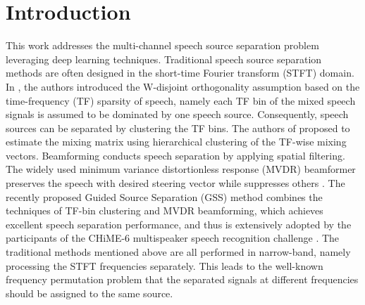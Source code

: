 \documentclass{article}
\begin{document}
\section{Introduction}
\label{sec:intro}
This work addresses the multi-channel speech source separation problem leveraging deep learning techniques. 
Traditional speech source separation methods are often designed in the short-time Fourier transform (STFT) domain.
In \cite{yilmaz_blind_2004}, the authors introduced the W-disjoint orthogonality assumption based on the time-frequency (TF) sparsity of speech, namely each TF bin of the mixed speech signals is assumed to be dominated by one speech source. Consequently, speech sources can be separated by clustering the TF bins. 
The authors of \cite{winter_map-based_2006} proposed to estimate the mixing matrix using hierarchical clustering of the TF-wise mixing vectors.
Beamforming conducts speech separation by applying spatial filtering.
The widely used minimum variance distortionless response (MVDR) beamformer preserves the speech with desired steering vector while suppresses others \cite{gannot_consolidated_2017}.
The recently proposed Guided Source Separation (GSS) \cite{boeddecker_front-end_2018} method combines the techniques of TF-bin clustering and MVDR beamforming, which achieves excellent speech separation performance, and thus is extensively adopted by the participants of the CHiME-6 multispeaker speech recognition challenge \cite{watanabe_chime-6_2020}.
The traditional methods mentioned above \cite{winter_map-based_2006, gannot_consolidated_2017, boeddecker_front-end_2018} are all performed in narrow-band, namely processing the STFT frequencies separately.
This leads to the well-known frequency permutation problem that the separated signals at different frequencies should be assigned to the same source.
\end{document}
